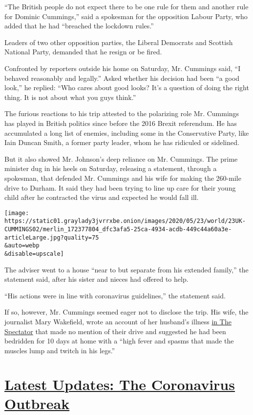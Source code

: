 ``The British people do not expect there to be one rule for them and
another rule for Dominic Cummings,'' said a spokesman for the opposition
Labour Party, who added that he had ``breached the lockdown rules.''

Leaders of two other opposition parties, the Liberal Democrats and
Scottish National Party, demanded that he resign or be fired.

Confronted by reporters outside his home on Saturday, Mr. Cummings said,
``I behaved reasonably and legally.'' Asked whether his decision had
been ``a good look,'' he replied: ``Who cares about good looks? It's a
question of doing the right thing. It is not about what you guys
think.''

The furious reactions to his trip attested to the polarizing role Mr.
Cummings has played in British politics since before the 2016 Brexit
referendum. He has accumulated a long list of enemies, including some in
the Conservative Party, like Iain Duncan Smith, a former party leader,
whom he has ridiculed or sidelined.

But it also showed Mr. Johnson's deep reliance on Mr. Cummings. The
prime minister dug in his heels on Saturday, releasing a statement,
through a spokesman, that defended Mr. Cummings and his wife for making
the 260-mile drive to Durham. It said they had been trying to line up
care for their young child after he contracted the virus and expected he
would fall ill.

\texttt{[image: https://static01.graylady3jvrrxbe.onion/images/2020/05/23/world/23UK-CUMMINGS02/merlin\_172377804\_dfc3afa5-25ca-4934-acdb-449c44a60a3e-articleLarge.jpg?quality=75\\\&auto=webp\\\&disable=upscale]}

The adviser went to a house ``near to but separate from his extended
family,'' the statement said, after his sister and nieces had offered to
help.

``His actions were in line with coronavirus guidelines,'' the statement
said.

If so, however, Mr. Cummings seemed eager not to disclose the trip. His
wife, the journalist Mary Wakefield, wrote an account of her husband's
illness
\href{https://www.spectator.co.uk/article/getting-coronavirus-does-not-bring-clarity}{in
The Spectator} that made no mention of their drive and suggested he had
been bedridden for 10 days at home with a ``high fever and spasms that
made the muscles lump and twitch in his legs.''

\hypertarget{latest-updates-the-coronavirus-outbreak}{%
\section{\texorpdfstring{\href{https://www.nytimes3xbfgragh.onion/2020/08/21/world/covid-19-coronavirus.html?action=click\&pgtype=Article\&state=default\&region=MAIN_CONTENT_1\&context=storylines_live_updates}{Latest
Updates: The Coronavirus
Outbreak}}{Latest Updates: The Coronavirus Outbreak}}\label{latest-updates-the-coronavirus-outbreak}}

